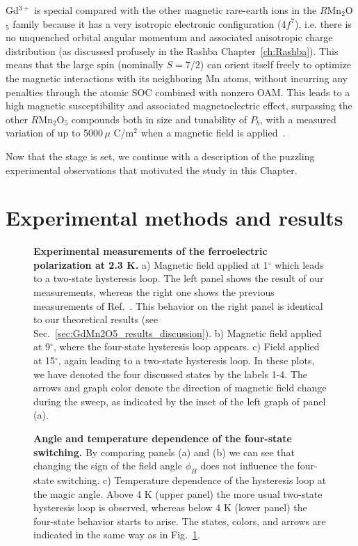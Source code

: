 Gd$^{3+}$ is special compared with the other magnetic rare-earth ions in the $R$Mn$_2$O$_5$ family because it has a very isotropic electronic configuration (4$f^7$), i.e. there is no unquenched orbital angular momentum and associated anisotropic charge distribution (as discussed profusely in the Rashba Chapter~\ref{ch:Rashba}). This means that the large spin (nominally $S=7/2$) can orient itself freely to optimize the magnetic interactions with its neighboring Mn atoms, without incurring any penalties through the atomic SOC combined with nonzero OAM.
This leads to a high magnetic susceptibility and associated magnetoelectric effect, surpassing the other $R$Mn$_2$O$_5$ compounds both in size and tunability of $P_b$, with a measured variation of up to 5000\,$\mu$ C/m$^2$ when a magnetic field is applied~\cite{Lee13}. 

Now that the stage is set, we continue with a description of the puzzling experimental observations that motivated the study in this Chapter.

\section{Experimental methods and results \label{sec:GdMn2O5_experiment}}
\begin{figure}
    \centering
\caption{ \label{fig:GdMn2O5_experiment1} {\bf Experimental measurements of the ferroelectric polarization at 2.3 K.} a) Magnetic field applied at 1$^\circ$ which leads to a two-state hysteresis loop. The left panel shows the result of our measurements, whereas the right one shows the previous measurements of Ref.~\cite{Lee13}. This behavior on the right panel is identical to our theoretical results (see Sec.~\ref{sec:GdMn2O5_results_discussion}). b) Magnetic field applied at 9$^\circ$, where the four-state hysteresis loop appears. c) Field applied at 15$^\circ$, again leading to a two-state hysteresis loop.  
In these plots, we have denoted the four discussed states by the labels 1-4. The arrows and graph color denote the direction of magnetic field change during the sweep, as indicated by the inset of the left graph of panel (a).}
\end{figure}
\begin{figure}
    \centering
\caption{ \label{fig:GdMn2O5_experiment2} {\bf Angle and temperature dependence of the four-state switching.} By comparing panels (a) and (b) we can see that changing the sign of the field angle $\phi_H$ does not influence the four-state switching. c) Temperature dependence of the hysteresis loop at the magic angle. Above 4 K (upper panel) the more usual two-state hysteresis loop is observed, whereas below 4 K (lower panel) the four-state behavior starts to arise. The states, colors, and arrows are indicated in the same way as in Fig.~\ref{fig:GdMn2O5_experiment1}.}
\end{figure}

